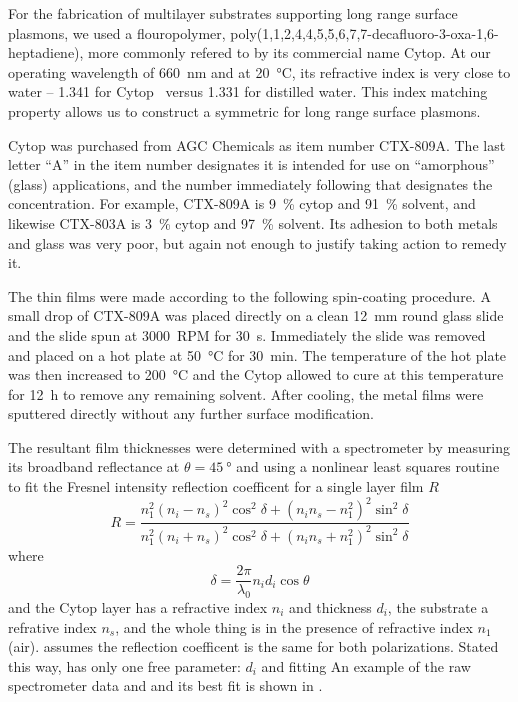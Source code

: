 For the fabrication of multilayer substrates supporting long range surface
plasmons, we used a flouropolymer,
poly(1,1,2,4,4,5,5,6,7,7-decafluoro-3-oxa-1,6-heptadiene), more commonly
refered to by 
its commercial name Cytop.  At our operating wavelength of \SI{660}{\nano\meter} and at
\SI{20}{\celsius}, its refractive index is very close to water --
1.341 for Cytop~\cite{mikevs2005synthesis} versus 1.331 for distilled
water.  This index matching property allows us to construct a symmetric for
long range surface plasmons.

Cytop was purchased from AGC Chemicals as item number CTX-809A.  The last
letter ``A'' in the item number designates it is intended for use on
``amorphous'' (glass) applications, and the number immediately
following that designates the concentration.  For example, CTX-809A is
\SI{9}{\percent} cytop and \SI{91}{\percent} solvent, and likewise CTX-803A
is \SI{3}{\percent} cytop and \SI{97}{\percent} solvent.  Its adhesion to
both metals and glass was very poor, but again not enough to justify taking
action to remedy it.

The thin films were made according to the following spin-coating procedure.
A small drop of CTX-809A was placed directly on a clean
\SI{12}{\milli\meter} round glass slide and the slide spun at
\SI{3000}{RPM} for \SI{30}{\second}.  Immediately the slide was removed and
placed on a hot plate at \SI{50}{\celsius} for \SI{30}{\minute}.  The
temperature of the hot plate was then increased to \SI{200}{\celsius} and
the Cytop allowed to cure at this temperature for \SI{12}{\hour} to remove
any remaining solvent.  After cooling, the metal films were sputtered
directly without any further surface modification.

The resultant film thicknesses were determined with a spectrometer by
measuring its broadband reflectance at $\theta=\SI{45}{\degree}$ and using
a nonlinear least squares routine~\cite{more1977LevAlgImpThe_2} to 
fit the Fresnel intensity reflection coefficent for a single layer
film $R$~\cite{steck2006classical} 
\begin{equation}
 R = \frac{n_1^2(n_i-n_s)^2 \cos^2\delta + (n_i n_s - n_1^2)^2\sin^2\delta}
          {n_1^2(n_i+n_s)^2 \cos^2\delta + (n_i n_s + n_1^2)^2\sin^2\delta}
          \label{eqn:fitfresnel}
\end{equation}
where
\begin{equation}
 \delta = \frac{2\pi}{\lambda_0} n_i d_i \cos \theta
\end{equation}
and the Cytop layer has a refractive index $n_i$ and thickness $d_i$, the
substrate a refrative index $n_s$, and the whole thing is in the presence
of refractive index $n_1$ (air).   assumes the
reflection coefficent is the same for both polarizations.  Stated this way,
 has only one free parameter: $d_i$ and fitting
An example of the raw spectrometer data and and its best fit is shown in
.

